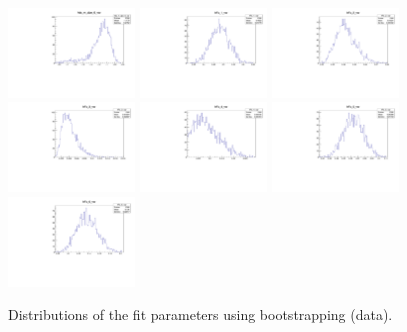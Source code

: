 \begin{figure}[tb]
\begin{center}
	\includegraphics[width=0.3\textwidth]{figs/DataVars/ds_m_dpe_6_var.pdf}
	\includegraphics[width=0.3\textwidth]{figs/DataVars/Fs_1_var.pdf}
	\includegraphics[width=0.3\textwidth]{figs/DataVars/Fs_2_var.pdf}
	\includegraphics[width=0.3\textwidth]{figs/DataVars/Fs_3_var.pdf}
	\includegraphics[width=0.3\textwidth]{figs/DataVars/Fs_4_var.pdf}
	\includegraphics[width=0.3\textwidth]{figs/DataVars/Fs_5_var.pdf}
	\includegraphics[width=0.3\textwidth]{figs/DataVars/Fs_6_var.pdf}
   \end{center}
   \caption{
	Distributions of the fit parameters using bootstrapping (data).
   }
   \label{fig:Vars_Data}
\end{figure}

